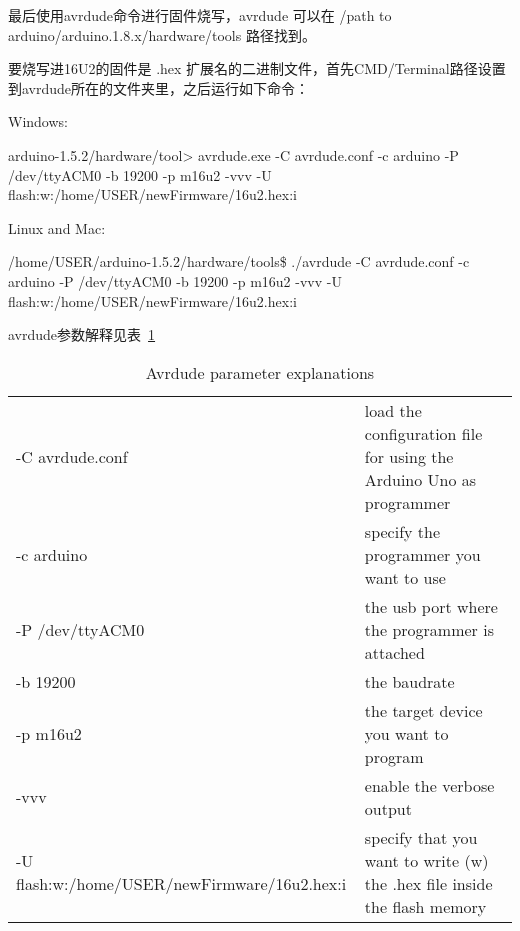 最后使用avrdude命令进行固件烧写，avrdude 可以在 /path to arduino/arduino.1.8.x/hardware/tools 路径找到。

要烧写进16U2的固件是 .hex 扩展名的二进制文件，首先CMD/Terminal路径设置到avrdude所在的文件夹里，之后运行如下命令：

Windows:

\begin{tcolorbox}
    arduino-1.5.2/hardware/tool> avrdude.exe -C avrdude.conf -c arduino -P /dev/ttyACM0 -b 19200 -p m16u2 -vvv -U flash:w:/home/USER/newFirmware/16u2.hex:i
\end{tcolorbox}

Linux and Mac:

\begin{tcolorbox}
    /home/USER/arduino-1.5.2/hardware/tools\$ ./avrdude -C avrdude.conf -c arduino -P /dev/ttyACM0 -b 19200 -p m16u2 -vvv -U flash:w:/home/USER/newFirmware/16u2.hex:i
\end{tcolorbox}

avrdude参数解释见表~\ref{tab:avrdude}

\begin{table}[htbp]
    \centering
    \begin{tabular}{ll}
    -C avrdude.conf                              & load the configuration file for using the Arduino Uno as programmer       \\
    -c arduino                                   & specify the programmer you want to use                                    \\
    -P /dev/ttyACM0                              & the usb port where the programmer is attached                             \\
    -b 19200                                     & the baudrate                                                              \\
    -p m16u2                                     & the target device you want to program                                     \\
    -vvv                                         & enable the verbose output                                                 \\
    -U flash:w:/home/USER/newFirmware/16u2.hex:i & specify that you want to write (w) the  .hex file inside the flash memory
    \end{tabular}
    \caption{Avrdude parameter explanations}
    \label{tab:avrdude}
\end{table}


